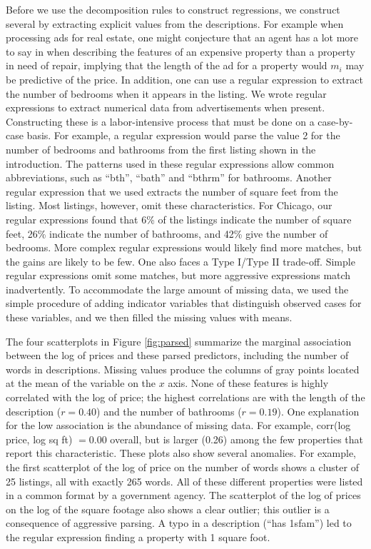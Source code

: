 \documentclass[12pt]{article}
\begin{document}
 Before we use the decomposition rules to construct regressions, we construct
 several by extracting explicit values from the descriptions.  For example when
 processing ads for real estate, one might conjecture that an agent has a lot
 more to say in when describing the features of an expensive property than a
 property in need of repair, implying that the length of the ad for a property
 would $m_i$ may be predictive of the price.  In addition, one can use a regular
 expression to extract the number of bedrooms when it appears in the listing.
  We wrote regular expressions to extract numerical data from advertisements
 when present.  Constructing these is a labor-intensive process that must be
 done on a case-by-case basis.  For example, a regular expression would parse
 the value 2 for the number of bedrooms and bathrooms from the first listing
 shown in the introduction.  The patterns used in these regular expressions
 allow common abbreviations, such as ``bth'', ``bath'' and ``bthrm'' for
 bathrooms.  Another regular expression that we used extracts the number of
 square feet from the listing.  Most listings, however, omit these
 characteristics.  For Chicago, our regular expressions found that 6\% of the
 listings indicate the number of square feet, 26\% indicate the number of
 bathrooms, and 42\% give the number of bedrooms.  More complex regular
 expressions would likely find more matches, but the gains are likely to be few.
  One also faces a Type I/Type II trade-off.  Simple regular
 expressions omit some matches, but more aggressive expressions 
 match inadvertently.  To accommodate the large amount of missing data, we used
 the simple procedure of adding indicator variables that distinguish observed
 cases for these variables, and we then filled the missing values with means.


 The four scatterplots in Figure \ref{fig:parsed} summarize the marginal
 association between the log of prices and these parsed predictors, including
 the number of words in descriptions.  Missing values produce the columns of
 gray points located at the mean of the variable on the $x$ axis.  None of these
 features is highly correlated with the log of price; the highest correlations
 are with the length of the description ($r=0.40$) and the number of bathrooms
 ($r = 0.19$).  One explanation for the low association is the abundance of
 missing data.  For example, corr(log price, log sq ft) $= 0.00$ overall, but is
  larger (0.26) among the few properties that report this characteristic.
  These plots also show several  anomalies.  For example, the first
 scatterplot of the log of price on the number of words shows a cluster of
 25 listings, all with exactly 265 words.  All of these different properties were listed in a common format by a government agency.   The scatterplot of the log of prices
 on the log of the square footage also shows a clear outlier; this outlier is a
 consequence of aggressive parsing.  A typo in a description (``has 1sfam'') led to  
 the regular expression finding a property with 1 square foot.
\end{document}
